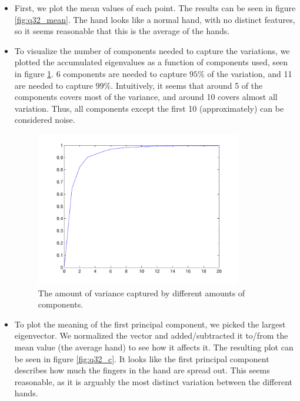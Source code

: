 \begin{itemize}
	\item
	First, we plot the mean values of each point.
	The results can be seen in figure \ref{fig:q32_mean}.
	The hand looks like a normal hand, with no distinct features, so it seems reasonable that this is the average of the hands.
	
	\item
	To visualize the number of components needed to capture the variations, we plotted the accumulated eigenvalues as a function of components used, seen in figure \ref{fig:q32_e}.
	6 components are needed to capture $95\%$ of the variation, and 11 are needed to capture $99\%$.
	Intuitively, it seems that around 5 of the components covers most of the variance, and around 10 covers almost all variation.
	Thus, all components except the first 10 (approximately) can be considered noise.
	
	\begin{figure}[!htbp]
	  \centering
	  \includegraphics[width=0.85\textwidth]{./images/q32_e}
	  \caption{The amount of variance captured by different amounts of components.}
	  \label{fig:q32_e}
	\end{figure}
	
	\item
	To plot the meaning of the first principal component, we picked the largest eigenvector.
	We normalized the vector and added/subtracted it to/from the mean value (the average hand) to see how it affects it.
	The resulting plot can be seen in figure \ref{fig:q32_c}.
	It looks like the first principal component describes how much the fingers in the hand are spread out.
	This seems reasonable, as it is arguably the most distinct variation between the different hands.
	

\end{itemize}
